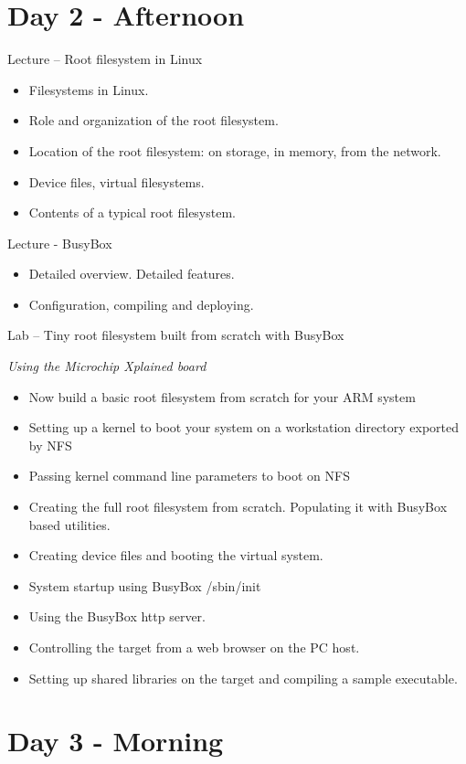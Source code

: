 \documentclass[a4paper,12pt,obeyspaces,spaces,hyphens]{article}
\begin{document}
\section{Day 2 - Afternoon}

\feagendatwocolumn
{Lecture – Root filesystem in Linux}
{
  \begin{itemize}
  \item Filesystems in Linux.
  \item Role and organization of the root filesystem.
  \item Location of the root filesystem: on storage, in memory,
        from the network.
  \item Device files, virtual filesystems.
  \item Contents of a typical root filesystem.
  \end{itemize}
}
{Lecture - BusyBox}
{
  \begin{itemize}
  \item Detailed overview. Detailed features.
  \item Configuration, compiling and deploying.
  \end{itemize}
}

\feagendaonecolumn
{Lab – Tiny root filesystem built from scratch with BusyBox}
{
  {\em Using the Microchip Xplained board}
  \begin{itemize}
  \item Now build a basic root filesystem from scratch for your ARM system
  \item Setting up a kernel to boot your system on a workstation
        directory exported by NFS
  \item Passing kernel command line parameters to boot on NFS
  \item Creating the full root filesystem from scratch.
        Populating it with BusyBox based utilities.
  \item Creating device files and booting the virtual system.
  \item System startup using BusyBox /sbin/init
  \item Using the BusyBox http server.
  \item Controlling the target from a web browser on the PC host.
  \item Setting up shared libraries on the target and compiling
        a sample executable.
  \end{itemize}
}

\section{Day 3 - Morning}
\end{document}
